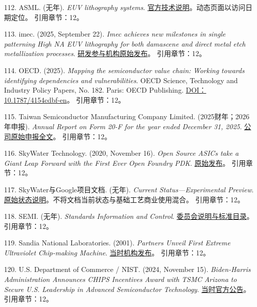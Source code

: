 \documentclass[UTF8,fontset=windows,12pt,a4paper,oneside,openany]{ctexbook}
\begin{document}
112. ASML. (无年). \emph{EUV lithography systems}. \href{https://www.asml.com/en/products/euv-lithography-systems}{官方技术说明}。动态页面以访问日期定位。
引用章节：12。

113. imec. (2025, September 22). \emph{Imec achieves new milestones in single patterning High NA EUV lithography for both damascene and direct metal etch metallization processes}. \href{https://www.imec-int.com/en/press/imec-achieves-new-milestones-single-patterning-high-na-euv-lithography-both-damascene-and}{研发参与机构原始发布}。
引用章节：12。

114. OECD. (2025). \emph{Mapping the semiconductor value chain: Working towards identifying dependencies and vulnerabilities}. OECD Science, Technology and Industry Policy Papers, No. 182. Paris: OECD Publishing. \href{https://doi.org/10.1787/4154cdbf-en}{DOI：10.1787/4154cdbf-en}。
引用章节：12。

115. Taiwan Semiconductor Manufacturing Company Limited. (2025财年；2026年申报). \emph{Annual Report on Form 20-F for the year ended December 31, 2025}. \href{https://investor.tsmc.com/sites/ir/sec-filings/2025_20F\%20Report.pdf}{公司原始申报全文}。
引用章节：12。

116. SkyWater Technology. (2020, November 16). \emph{Open Source ASICs take a Giant Leap Forward with the First Ever Open Foundry PDK}. \href{https://www.skywatertechnology.com/open-source-asics-take-a-giant-leap-forward-with-first-ever-open-foundry-pdk/}{原始发布}。
引用章节：12。

117. SkyWater与Google项目文档. (无年). \emph{Current Status—Experimental Preview}. \href{https://skywater-pdk.readthedocs.io/en/main/status.html}{原始状态说明}。不将文档当前状态与基础工艺商业使用混合。
引用章节：12。

118. SEMI. (无年). \emph{Standards Information and Control}. \href{https://www.semi.org/en/products-services/standards/information_and_control}{委员会说明与标准目录}。
引用章节：12。

119. Sandia National Laboratories. (2001). \emph{Partners Unveil First Extreme Ultraviolet Chip-making Machine}. \href{https://newsreleases.sandia.gov/partners-unveil-first-extreme-ultraviolet-chip-making-machine/}{当时机构发布}。
引用章节：12。

120. U.S. Department of Commerce / NIST. (2024, November 15). \emph{Biden-Harris Administration Announces CHIPS Incentives Award with TSMC Arizona to Secure U.S. Leadership in Advanced Semiconductor Technology}. \href{https://www.nist.gov/news-events/news/2024/11/biden-harris-administration-announces-chips-incentives-award-tsmc-arizona}{当时官方公告}。
引用章节：12。
\end{document}
